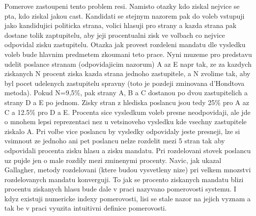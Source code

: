 \documentclass[12pt,a4paper]{scrreprt}
\begin{document}
Pomerove zastoupeni tento problem resi.
Namisto otazky kdo ziskal nejvice se pta, kdo ziskal jakou cast. Kandidati se stejnym nazorem pak do voleb vstupuji jako kandidujici politicka strana, volici hlasuji pro strany a kazda strana pak dostane tolik zaptupitelu, aby jeji procentualni zisk ve volbach co nejvice odpovidal zisku zastupitelu.
Otazka jak provest rozdeleni mandatu dle vysledku voleb bude hlavnim predmetem zkoumani teto prace.
Nyni muzeme pro predstavu udelit poslance stranam (odpovidajicim nazorum) A az E napr tak, ze za kazdych ziskanych N procent ziska kazda strana jednoho zastupitele, a N zvolime tak, aby byl pocet udelenych zastupitelu spravny (toto je pozdeji zminovana d'Hondtova metoda).
Pokud N=9,5\%, pak strany A, B a C dostanou po dvou zastupitelich a strany D a E po jednom.
Zisky stran z hlediska poslancu jsou tedy 25\% pro A az C a 12.5\% pro D a E.
Procenta sice vysledkum voleb presne neodpovidaji, ale jde o mnohem lepsi reprezentaci nez u vetsinoveho vysledku kde vsechny zastupitele ziskalo A.
Pri volbe vice poslancu by vysledky odpovidaly jeste presneji, lze si vsimnout ze jednoho ani pet poslancu nelze  rozdelit mezi 5 stran tak aby odpovidali procenta zisku hlasu a zisku mandatu.
Pri rozdelovani stovek poslancu uz pujde jen o male rozdily mezi zminenymi procenty.
Navic, jak ukazal Gallagher, metody rozdelovani (ktere budou vysvetleny nize) pri velkem mnozstvi rozdelovanych mandatu konverguji.\autocite{GAL1}
To jak se procento ziskanych mandatu  blizi procentu ziskanych hlasu bude dale v praci nazyvano pomerovosti systemu.
I kdyz existuji numericke indexy pomerovosti, lisi se stale nazor na jejich vyznam a tak be v praci vyuzita intuitivni definice pomerovosti.\autocite{GAL2}
\end{document}
